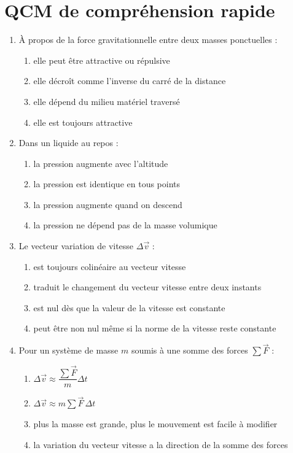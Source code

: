 \documentclass[11pt,a4paper]{article}
\begin{document}
\section{QCM de compréhension rapide}
\begin{enumerate}[label=\textbf{QCM \arabic*.},leftmargin=*]
\item À propos de la force gravitationnelle entre deux masses ponctuelles :
\begin{enumerate}[label=\alph*)]
\item elle peut être attractive ou répulsive
\item elle décroît comme l'inverse du carré de la distance
\item elle dépend du milieu matériel traversé
\item elle est toujours attractive
\end{enumerate}
\item Dans un liquide au repos :
\begin{enumerate}[label=\alph*)]
\item la pression augmente avec l'altitude
\item la pression est identique en tous points
\item la pression augmente quand on descend
\item la pression ne dépend pas de la masse volumique
\end{enumerate}
\item Le vecteur variation de vitesse $\Delta \vec v$ :
\begin{enumerate}[label=\alph*)]
\item est toujours colinéaire au vecteur vitesse
\item traduit le changement du vecteur vitesse entre deux instants
\item est nul dès que la valeur de la vitesse est constante
\item peut être non nul même si la norme de la vitesse reste constante
\end{enumerate}
\item Pour un système de masse $m$ soumis à une somme des forces $\sum \vec F$ :
\begin{enumerate}[label=\alph*)]
\item $\Delta \vec v \approx \dfrac{\sum \vec F}{m}\Delta t$
\item $\Delta \vec v \approx m\sum \vec F\,\Delta t$
\item plus la masse est grande, plus le mouvement est facile à modifier
\item la variation du vecteur vitesse a la direction de la somme des forces

\end{enumerate}
\end{enumerate}
\end{document}
